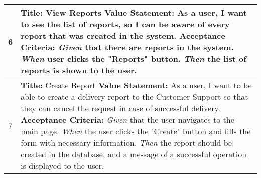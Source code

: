\documentclass[a4paper]{article}
\begin{document}
\begin{longtable}[c]{|p{0.5cm}||p{}|}
                \\
             \hline
              6 & 
                 \textbf{Title:} View Reports  \newline
                 \textbf{Value Statement:} As a user, I want to see the list of reports, so I can be aware of every report that was created in the system.
                 \newline
                 \textbf{Acceptance Criteria:} \newline
                 \emph{Given} that there are reports in the system. \newline 
                 \emph{When} user clicks the "Reports" button. \newline
                 \emph{Then} the list of reports is shown to the user.\\            
            \hline
              7 & 
                 \textbf{Title:} Create Report  \newline
                 \textbf{Value Statement:} As a user, I want to be able to create a delivery report to the Customer Support so that they can cancel the request in case of successful delivery.
                 \newline
                 \textbf{Acceptance Criteria:} \newline
                 \emph{Given} that the user navigates to the main page. \newline 
                 \emph{When} the user clicks the "Create" button and fills the form with necessary information.\newline
                 \emph{Then} the report should be created in the database, and a message of a successful operation is displayed to the user.
                \\            
 

\end{longtable}
\end{document}
